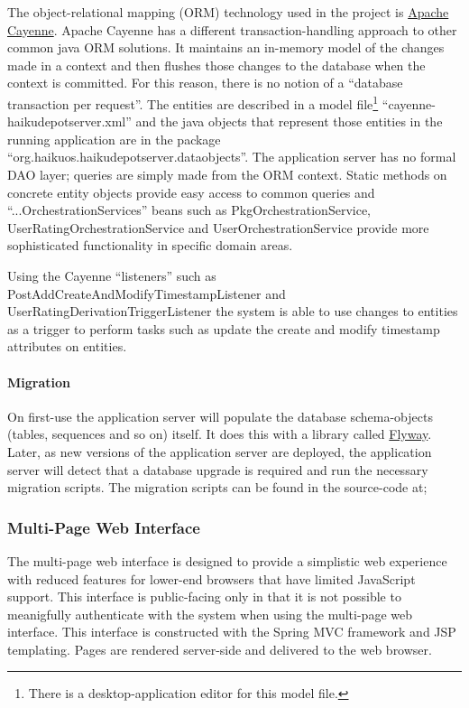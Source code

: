The object-relational mapping (ORM) technology used in the project is \href{http://cayenne.apache.org/}{Apache Cayenne}.  Apache Cayenne has a different transaction-handling approach to other common java ORM solutions.  It maintains an in-memory model of the changes made in a context and then flushes those changes to the database when the context is committed.  For this reason, there is no notion of a ``database transaction per request''.  The entities are described in a model file\footnote{There is a desktop-application editor for this model file.} ``cayenne-haikudepotserver.xml'' and the java objects that represent those entities in the running application are in the package ``org.haikuos.haikudepotserver.dataobjects''.  The application server has no formal DAO layer; queries are simply made from the ORM context.  Static methods on concrete entity objects provide easy access to common queries and ``...OrchestrationServices'' beans such as PkgOrchestrationService, UserRatingOrchestrationService and UserOrchestrationService provide more sophisticated functionality in specific domain areas.

Using the Cayenne ``listeners'' such as PostAddCreateAndModifyTimestampListener and UserRatingDerivationTriggerListener the system is able to use changes to entities as a trigger to perform tasks such as update the create and modify timestamp attributes on entities.

\paragraph{Migration}

On first-use the application server will populate the database schema-objects (tables, sequences and so on) itself.  It does this with a library called \href{http://flywaydb.org/}{Flyway}.  Later, as new versions of the application server are deployed, the application server will detect that a database upgrade is required and run the necessary migration scripts.  The migration scripts can be found in the source-code at;


\subsubsection{Multi-Page Web Interface}

The multi-page web interface is designed to provide a simplistic web experience with reduced features for lower-end browsers that have limited JavaScript support.  This interface is public-facing only in that it is not possible to meanigfully authenticate with the system when using the multi-page web interface.  This interface is constructed with the Spring MVC framework and JSP templating.  Pages are rendered server-side and delivered to the web browser.

